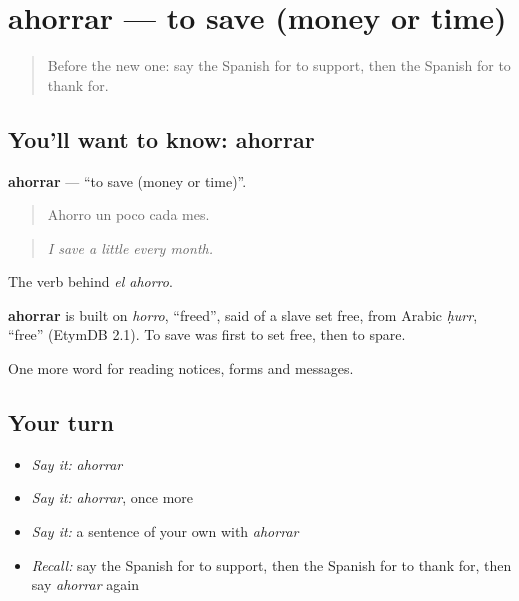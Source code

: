 \section[ahorrar]{ahorrar — to save (money or time)}

\label{lesson:ES-C484-ahorrar}



\begin{quote}
Before the new one: say the Spanish for to support, then the Spanish for to thank for.
\end{quote}

\subsection*{You'll want to know: ahorrar}
\textbf{ahorrar} — \textquotedblleft{}to save (money or time)\textquotedblright{}.

\begin{quote}
Ahorro un poco cada mes.
\end{quote}

\begin{quote}
\emph{I save a little every month.}
\end{quote}

The verb behind \emph{el ahorro}.

\begin{cousinweb}
\textbf{ahorrar} is built on \emph{horro}, \textquotedblleft{}freed\textquotedblright{}, said of a slave set free, from Arabic \emph{ḥurr}, \textquotedblleft{}free\textquotedblright{} (EtymDB 2.1). To save was first to set free, then to spare.
\end{cousinweb}

\begin{grammarlens}[title={What you've built}]
One more word for reading notices, forms and messages.
\end{grammarlens}

\subsection*{Your turn}
\begin{itemize}
\raggedright
  \item \emph{Say it:} \emph{ahorrar}
  \item \emph{Say it:} \emph{ahorrar}, once more
  \item \emph{Say it:} a sentence of your own with \emph{ahorrar}
  \item \emph{Recall:} say the Spanish for to support, then the Spanish for to thank for, then say \emph{ahorrar} again
\end{itemize}

